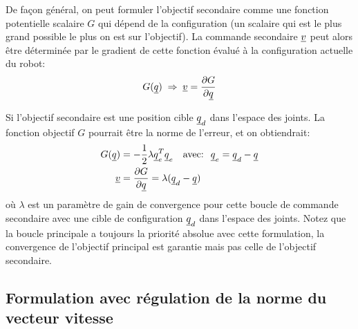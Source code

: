 De façon général, on peut formuler l'objectif secondaire comme une fonction potentielle scalaire $G$ qui dépend de la configuration (un scalaire qui est le plus grand possible le plus on est sur l'objectif). La commande secondaire $\underline{v}$ peut alors être déterminée par le gradient de cette fonction évalué à la configuration actuelle du robot:
\begin{align}
G( \underline{q} ) \; \Rightarrow \; \underline{v} = \frac{\partial G }{\partial \underline{q} }
\end{align}

Si l'objectif secondaire est une position cible $\underline{q}_d$ dans l'espace des joints. La fonction objectif $G$ pourrait être la norme de l'erreur, et on obtiendrait:
\begin{align}
G( \col{q} ) &= - \frac{1}{2} \lambda \col{q}_e^T \col{q}_e
\quad \text{avec: } \; \col{q}_e = \col{q}_d - \col{q} \\
\col{v} &= \frac{\partial G }{\partial \col{q} } = \lambda \huge( \col{q}_d - \col{q} \huge)
\end{align}
où $\lambda$ est un paramètre de gain de convergence pour cette boucle de commande secondaire avec une cible de configuration $\underline{q}_d$ dans l'espace des joints. Notez que la boucle principale a toujours la priorité absolue avec cette formulation, la convergence de l'objectif principal est garantie mais pas celle de l'objectif secondaire. 

\subsection{Formulation avec régulation de la norme du vecteur vitesse}

